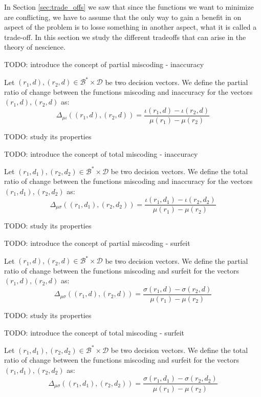 In Section \ref{sec:trade_offs} we saw that since the functions we want to minimize are conflicting, we have to assume that the only way to gain a benefit in on aspect of the problem is to losse something in another aspect, what it is called a trade-off. In this section we study the different tradeoffs that can arise in the theory of nescience.

{\color{red} TODO: introduce the concept of partial miscoding - inaccuracy}

\begin{definition}
Let $(r_1, d), (r_2, d) \in \mathcal{B}^\ast \times \mathcal{D}$ be two decision vectors. We define the partial ratio of change between the functions miscoding and inaccuracy for the vectors $(r_1, d), (r_2, d)$ as:
\[
\Delta_{\mu \iota} \left( (r_1, d), (r_2, d) \right) = \frac{ \iota(r_1, d) - \iota(r_2, d) }{ \mu(r_1) - \mu(r_2) }
\] 
\end{definition}

{\color{red} TODO: study its properties}

{\color{red} TODO: introduce the concept of total miscoding - inaccuracy}

\begin{definition}
Let $(r_1, d_1), (r_2, d_2) \in \mathcal{B}^\ast \times \mathcal{D}$ be two decision vectors. We define the total ratio of change between the functions miscoding and inaccuracy for the vectors $(r_1, d_1), (r_2, d_2)$ as:
\[
\Delta_{\mu \sigma} \left( (r_1, d_1), (r_2, d_2) \right) = \frac{ \iota(r_1, d_1) - \iota(r_2, d_2) }{ \mu(r_1) - \mu(r_2) }
\] 
\end{definition}

{\color{red} TODO: study its properties}

{\color{red} TODO: introduce the concept of partial miscoding - surfeit}

\begin{definition}
Let $(r_1, d), (r_2, d) \in \mathcal{B}^\ast \times \mathcal{D}$ be two decision vectors. We define the partial ratio of change between the functions miscoding and surfeit for the vectors $(r_1, d), (r_2, d)$ as:
\[
\Delta_{\mu \sigma} \left( (r_1, d), (r_2, d) \right) = \frac{ \sigma(r_1, d) - \sigma(r_2, d) }{ \mu(r_1) - \mu(r_2) }
\] 
\end{definition}

{\color{red} TODO: study its properties}

{\color{red} TODO: introduce the concept of total miscoding - surfeit}

\begin{definition}
Let $(r_1, d_1), (r_2, d_2) \in \mathcal{B}^\ast \times \mathcal{D}$ be two decision vectors. We define the total ratio of change between the functions miscoding and surfeit for the vectors $(r_1, d_1), (r_2, d_2)$ as:
\[
\Delta_{\mu \sigma} \left( (r_1, d_1), (r_2, d_2) \right) = \frac{ \sigma(r_1, d_1) - \sigma(r_2, d_2) }{ \mu(r_1) - \mu(r_2) }
\] 
\end{definition}

